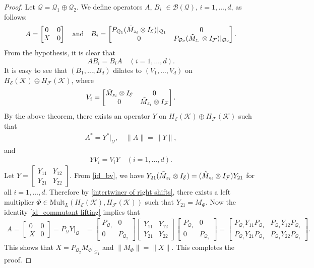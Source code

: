 \documentclass[12pt]{amsart}%
\numberwithin{equation}{section}
\newcommand{\clb}{\mathcal{B}}
\newcommand{\cle}{\mathcal{E}}
\newcommand{\clf}{\mathcal{F}}
\newcommand{\clk}{\mathcal{K}}
\newcommand{\clq}{\mathcal{Q}}
\begin{document}
\begin{proof}
Let $\clq=\clq_1\oplus \clq_2$. We define operators $A$, $B_i$ $\in\clb(\clq)$, $i=1,\ldots, d$, as follows: 
\[ A=\begin{bmatrix} 0&0\\
X&0\end{bmatrix}\quad\text{and}\quad B_i=\begin{bmatrix} P_{\clq_1} (\Tilde{M}_{z_i} \otimes I_{\cle})|_{\clq_1}&0\\
0&P_{\clq_2} (\Tilde{M}_{z_i} \otimes I_{\clf})|_{\clq_2}\end{bmatrix}.\]
From the hypothesis, it is clear that 
\[A B_i=B_i A \quad (i=1,\ldots, d).\]
It is easy to see that $(B_1, \ldots, B_d)$ dilates to $(V_1,\ldots
, V_d)$ on $H_\cle(\clk)\oplus H_\clf(\clk)$, where
\[
V_i=\begin{bmatrix} \Tilde{M}_{z_i} \otimes I_{\cle} &0\\
0&\Tilde{M}_{z_i} \otimes I_{\clf}\end{bmatrix}.
\]
By the above theorem, there exists an operator $Y$ on $H_\cle(\clk)\oplus H_\clf(\clk)$ such that 
\begin{align}\label{id_commutant lifting}
A^*=Y^*|_{\clq},  \quad \|A\|=\|Y\|,\end{align}
and 
\begin{align}\label{id_bv}
Y  V_i= V_i Y \quad (i=1, \ldots, d).\end{align}
Let $Y=\begin{bmatrix} Y_{11} &Y_{12}\\
Y_{21}&Y_{22}\end{bmatrix}$. From \eqref{id_bv}, we have $Y_{21}(\Tilde{M}_{z_i} \otimes I_{\cle})= (\Tilde{M}_{z_i} \otimes I_{\clf}) Y_{21} $ for all $i=1, \ldots, d$. Therefore by \ref{intertwiner of right shifts}, there exists a left multiplier $\Phi\in \text{Mult}_L(H_\cle(\clk),H_\clf(\clk))$ such that $Y_{21}=M_\Phi$. Now the identity \eqref{id_commutant lifting} implies that 
\begin{align*}
A=\begin{bmatrix} 0&0\\
X&0\end{bmatrix}=P_\clq Y|_\clq &=  \begin{bmatrix} P_{\clq_1}&0\\
0&P_{\clq_2}\end{bmatrix}\begin{bmatrix} Y_{11} &Y_{12}\\
Y_{21}&Y_{22}\end{bmatrix}  \begin{bmatrix} P_{\clq_1}&0\\
0&P_{\clq_2}\end{bmatrix}= \begin{bmatrix} P_{\clq_1}Y_{11} P_{\clq_1} & P_{\clq_1}Y_{12}P_{\clq_1}\\
P_{\clq_1}Y_{21}P_{\clq_1}&P_{\clq_1}Y_{22}P_{\clq_1}\end{bmatrix}.
\end{align*}
This shows that $X=P_{\clq_2} M_\Phi|_{\clq_1}$ and $\|M_\Phi\|=\|X\|$. This completes the proof. 
\end{proof} 
\end{document}
